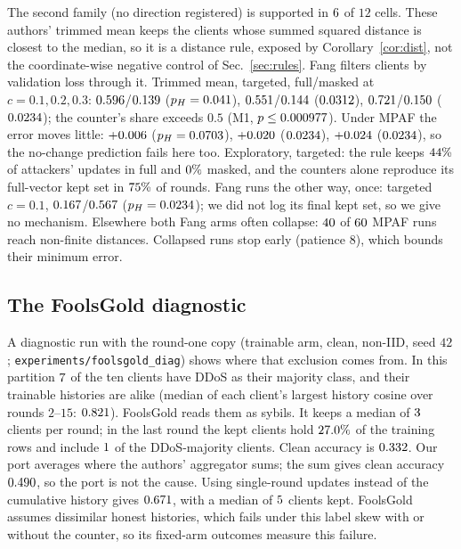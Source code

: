 \documentclass[journal]{IEEEtran}
\begin{document}
The second family (no direction registered) is supported in $6$ of $12$ cells.
These authors' trimmed mean keeps the clients whose summed squared distance is closest to the
median, so it is a distance rule, exposed by Corollary~\ref{cor:dist}, not the coordinate-wise
negative control of Sec.~\ref{sec:rules}. Fang filters clients by validation loss through it.
Trimmed mean, targeted, full/masked at $c=0.1,0.2,0.3$: $0.596$/$0.139$
($p_H=0.041$), $0.551$/$0.144$ ($0.0312$),
$0.721$/$0.150$ ($0.0234$); the counter's share exceeds
$0.5$ (M1, $p\le0.000977$). Under MPAF the error moves little: $+0.006$
($p_H=0.0703$), $+0.020$ ($0.0234$), $+0.024$
($0.0234$), so the no-change prediction fails here too. Exploratory, targeted: the rule keeps
$44\%$ of attackers' updates in full and $0\%$ masked, and the counters
alone reproduce its full-vector kept set in $75\%$ of rounds. Fang runs the other way, once: targeted $c=0.1$,
$0.167$/$0.567$ ($p_H=0.0234$); we did not log its final
kept set, so we give no mechanism. Elsewhere both Fang arms often collapse: $40$ of $60$ MPAF runs
reach non-finite distances. Collapsed runs stop early (patience $8$), which bounds their minimum error.

\subsection{The FoolsGold diagnostic}
\label{sup:fgdiag}
A diagnostic run with the round-one copy (trainable arm, clean, non-IID, seed
$42$; \texttt{experiments/foolsgold\_diag}) shows where that exclusion comes from.
In this partition $7$ of the ten clients have DDoS as their
majority class, and their trainable histories are alike (median of each client's
largest history cosine over rounds $2$--$15$: $0.821$). FoolsGold
reads them as sybils. It keeps a median of $3$ clients per round;
in the last round the kept clients hold $27.0\%$ of the training rows
and include $1$ of the DDoS-majority clients. Clean accuracy is
$0.332$. Our port averages where the authors' aggregator sums; the sum gives clean accuracy
$0.490$, so the port is not the cause. Using single-round updates instead of the cumulative history gives
$0.671$, with a median of $5$ clients kept. FoolsGold
assumes dissimilar honest histories, which fails under this label skew with or without the
counter, so its fixed-arm outcomes measure this failure.
\end{document}
